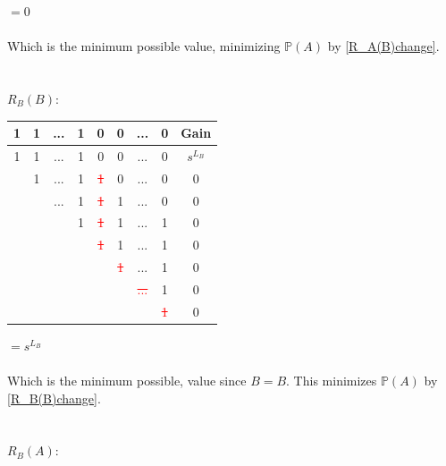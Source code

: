 \documentclass[english,12pt,a4paper,final]{article}
\begin{document}
$=0$
\\\\
Which is the minimum possible value, minimizing $\mathbb{P}(A)$ by \eqref{R_A(B)change}.
\\\\\\
${R_B(B)}$:
\begin{tabular}{|cccccccc|c|}
	\hline
	1 & 1 & ... & 1 & 0 & 0 & ... & 0 & Gain \\
	\hline
	
	\textcolor{OliveGreen}{1} & \textcolor{OliveGreen}{1} & \textcolor{OliveGreen}{...} & \textcolor{OliveGreen}{1} & \textcolor{OliveGreen}{0} & \textcolor{OliveGreen}{0} & \textcolor{OliveGreen}{...} & \textcolor{OliveGreen}{0} & $s^{L_B}$\\
	
	& \textcolor{OliveGreen}{1} & \textcolor{OliveGreen}{...} & \textcolor{OliveGreen}{1} & \textcolor{red}{\sout{1}} & 0 & ... & 0 & $0$ \\
	
	&  & \textcolor{OliveGreen}{...} & \textcolor{OliveGreen}{1} & \textcolor{red}{\sout{1}} & 1 & ... & 0 & $0$ \\
	
	&  &  & \textcolor{OliveGreen}{1} & \textcolor{red}{\sout{1}} & 1 & ... & 1 & $0$ \\
	
	&  &  &  & \textcolor{red}{\sout{1}} & 1 & ... & 1 & $0$ \\
	
	&  &  &  &  & \textcolor{red}{\sout{1}} & ... & 1 & $0$ \\
	
	&  &  &  &  &  & \textcolor{red}{\sout{...}} & 1 & $0$ \\
	
	&  &  &  &  &  &  & \textcolor{red}{\sout{1}} & $0$ \\
	\hline
\end{tabular}
$=s^{L_B}$
\\\\
Which is the minimum possible, value since $B=B$. This minimizes $\mathbb{P}(A)$ by \eqref{R_B(B)change}.
\\\\\\
${R_B(A)}$:
\end{document}
